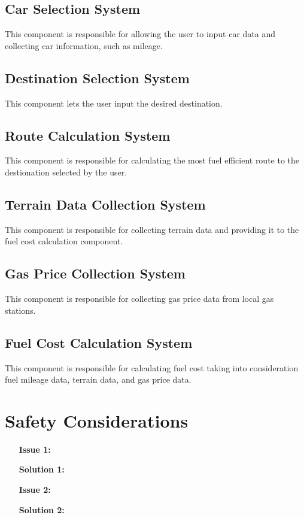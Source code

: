 \documentclass{article}
\begin{document}
\subsection{Car Selection System}
This component is responsible for allowing the user to input car data and collecting car information, such as mileage.

\subsection{Destination Selection System}
This component lets the user input the desired destination.

\subsection{Route Calculation System}
This component is responsible for calculating the most fuel efficient route to the destionation selected by the user.

\subsection{Terrain Data Collection System}
This component is responsible for collecting terrain data and providing it to the fuel cost calculation component.

\subsection{Gas Price Collection System}
This component is responsible for collecting gas price data from local gas stations.

\subsection{Fuel Cost Calculation System}
This component is responsible for calculating fuel cost taking into consideration fuel mileage data, terrain data, and gas price data.

\section{Safety Considerations}
\begin{itemize}
	\item[\textbf{Issue 1:}]
	\item[\textbf{Solution 1:}]
	\item[\textbf{Issue 2:}]
	\item[\textbf{Solution 2:}]
\end{itemize}
\end{document}
